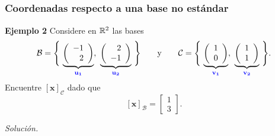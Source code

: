 
\subsection{}

\begin{frame}\frametitle{Coordenadas respecto a una  base no estándar}

\begin{ej}{\textbf{Ejemplo 2}}
	Considere en $\mathbb{R}^2$ las bases
	\[
	\mathcal{B} = \Bigg\{ \, \underbrace{ \left( \begin{array}{r}	-1 \\ 2 \end{array} \right) }_{\color{blue}\mathbf{u_1}}, \ 
	\underbrace{ \left( \begin{array}{r} 2 \\ -1 \end{array} \right) }_{\color{blue}\mathbf{u_2}} \, \Bigg\}
	\qquad \text{y} \qquad
	\mathcal{C} = \Bigg\{ \, \underbrace{ \left( \begin{array}{c}	1 \\ 0 \end{array} \right) }_{\color{blue}\mathbf{v_1}}, \ 
	\underbrace{ \left( \begin{array}{r}  1 \\ 1 \end{array} \right) }_{\color{blue}\mathbf{v_2}} \, \Bigg\}.
	\]
	Encuentre $\left[ \mathbf{x} \right]_{\mathcal{C}}$ dado que
	\[
	\left[ \mathbf{x} \right]_{\mathcal{B}} = 
	\left[
	\begin{array}{c}
	1\\
	3
	\end{array}
	\right].
	\]
\end{ej}
\textit{Solución.}

\end{frame}


\subsection{}

